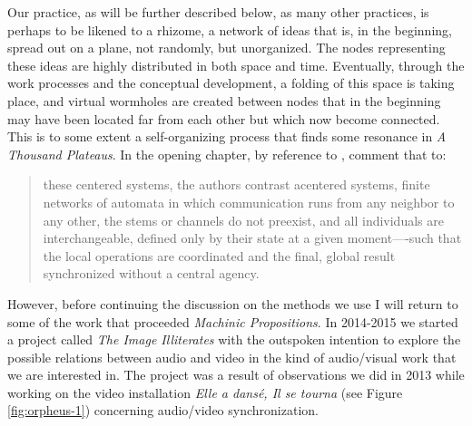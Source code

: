 \documentclass[11pt]{article}
\begin{document}
Our practice, as will be further described below, as many other
practices, is perhaps to be likened to a rhizome, a network of ideas
that is, in the beginning, spread out on a plane, not randomly, but
unorganized. The nodes representing these ideas are highly distributed
in both space and time. Eventually, through the work processes and the
conceptual development, a folding of this space is taking place, and
virtual wormholes are created between nodes that in the beginning may
have been located far from each other but which now become
connected. This is to some extent a self-organizing process that finds
some resonance in \emph{A Thousand Plateaus}. In the opening chapter, by reference to
\citet{rosenstiehl974}, \citeauthor{deleuze80} comment that to:

\begin{quote}
  these centered systems, the authors contrast acentered systems,
  finite networks of automata in which communication runs from any
  neighbor to any other, the stems or channels do not preexist, and
  all individuals are interchangeable, defined only by their state at
  a given moment—-such that the local operations are coordinated and
  the final, global result synchronized without a central
  agency. \citep[p. 19]{deleuze80}
\end{quote}

However, before continuing the discussion on the methods we use I will
return to some of the work that proceeded \emph{Machinic
  Propositions}. In 2014-2015 we started a project called \emph{The
  Image Illiterates} with the outspoken intention to explore the
possible relations between audio and video in the kind of audio/visual
work that we are interested in. The project was a result of
observations we did in 2013 while working on the video installation
\emph{Elle a dansé, Il se tourna} (see Figure \ref{fig:orpheus-1}) concerning
audio/video synchronization.
\end{document}
